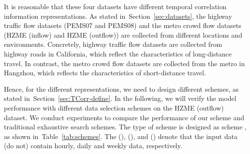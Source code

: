 \documentclass[sn-mathphys,iicol]{sn-jnl}
\newcommand\tabref[1]{Table~\ref{#1}}
\newcommand\secref[1]{Section~\ref{#1}}
\theoremstyle{thmstyleone}\newtheorem{theorem}{Theorem}\newtheorem{proposition}[theorem]{Proposition}
\theoremstyle{thmstyletwo}\newtheorem{example}{Example}\newtheorem{remark}{Remark}
\theoremstyle{thmstylethree}\newtheorem{definition}{Definition}
\begin{document}
\begin{table}[h]
    \centering
    \caption{Temporal correlation information (average) on four datasets.}
    \label{tab:TCorr-avg}
\end{table}



It is reasonable that these four datasets have different temporal correlation information representations. As stated in~\secref{sec:datasets}, the highway traffic flow datasets (PEMS07 and PEMS08) and the metro crowd flow datasets (HZME (inflow) and HZME (outflow)) are collected from different locations and environments. Concretely, highway traffic flow datasets are collected from highway roads in California, which reflect the characteristics of long-distance travel. In contrast, the metro crowd flow datasets are collected from the metro in Hangzhou, which reflects the characteristics of short-distance travel.



Hence, for the different representations, we need to design different schemes, as stated in~\secref{sec:TCorr-define}. In the following, we will verify the model performance with different data selection schemes on the HZME (outflow) dataset. We conduct experiments to compare the performance of our scheme and traditional exhaustive search schemes. The type of scheme is designed as scheme , as shown in~\tabref{tab:schemes}. The  (),  (), and  () denote that the input data (do not) contain hourly, daily and weekly data, respectively. 
\end{document}
